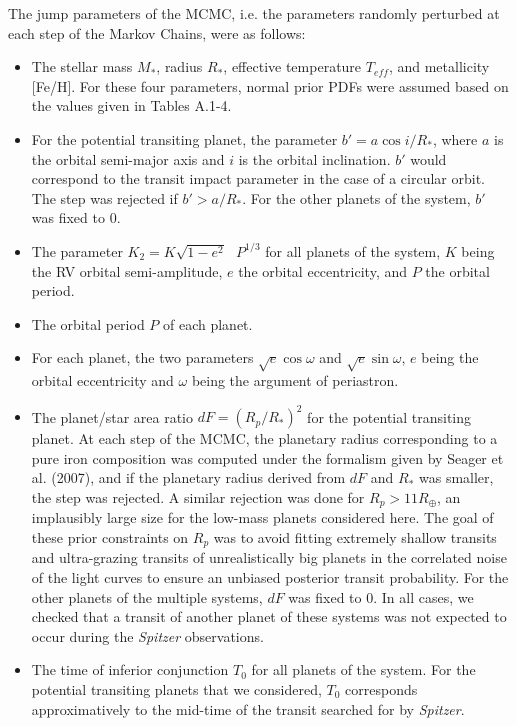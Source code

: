 \documentclass[traditabstract]{aa}
\begin{document}
The jump parameters of the MCMC, i.e. the parameters randomly perturbed at each step of the Markov Chains, were as follows:
 \begin{itemize}
\item The stellar mass $M_\ast$, radius $R_\ast$, effective temperature $T_{eff}$, and metallicity [Fe/H]. For 
these four parameters, normal prior PDFs  were assumed based on the values given in Tables A.1-4.
\item For the potential transiting planet, the parameter  $b' = a \cos{i}/R_\ast$, where $a$ is the orbital
 semi-major axis and $i$ is the orbital inclination. $b'$ would correspond to the transit impact parameter in the case of a circular orbit. 
 The step was rejected if $b' > a/R_\ast$. For the other planets of the system,  $b'$ was fixed to 0.
 \item The parameter $K_2 = K  \sqrt{1-e^2}   \textrm{ }  P^{1/3}$ for all planets of the system, $K$ being the RV orbital 
semi-amplitude, $e$ the orbital eccentricity, and $P$ the orbital period.
 \item The orbital period $P$ of each planet.
 \item For each planet, the two parameters $\sqrt{e} \cos{\omega}$ and $\sqrt{e} \sin{\omega}$, $e$ being the 
orbital eccentricity and $\omega$ being the argument of periastron.
 \item The planet/star area ratio $dF = (R_p/R_\ast)^2$ for the potential transiting planet.  At each step of the MCMC, 
 the planetary radius  corresponding to a pure iron composition was computed under the formalism given by Seager et al. 
 (2007), and if the planetary radius derived from $dF$ and $R_\ast$ was smaller, the step was rejected. A similar rejection 
 was done for $R_p > 11 R_\oplus$, an  implausibly large size for the low-mass planets considered here. The 
goal of these prior constraints on $R_p$ was to avoid  fitting extremely shallow transits and 
ultra-grazing transits of unrealistically big planets in the correlated noise of the light curves to ensure an 
unbiased posterior transit probability. For the other planets of the multiple systems, $dF$ was fixed to 0. 
In all cases, we checked that a transit of another planet of these systems was not expected to occur
during the {\it Spitzer} observations. 
\item The time of inferior conjunction $T_0$ for all planets of the system. For the potential transiting 
planets that we considered, $T_0$ corresponds approximatively to the mid-time of the transit searched for by {\it Spitzer}. 
\end{itemize}
\end{document}
